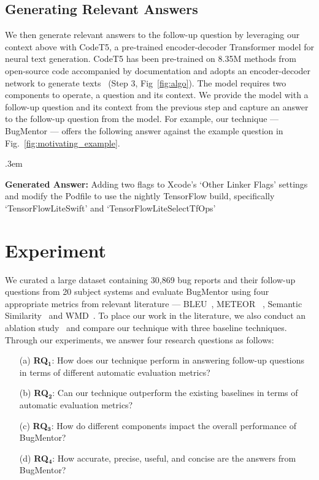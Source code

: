 \subsection{Generating Relevant Answers}
We then generate relevant answers to the follow-up question by leveraging our context above with CodeT5, a pre-trained encoder-decoder Transformer model for neural text generation. CodeT5 has been pre-trained on  8.35M methods from open-source code accompanied by documentation and adopts an encoder-decoder network to generate texts~\cite{wang2021codet5} (Step 3, Fig~\ref{fig:algo}). The model requires two components to operate, a question and its context. We provide the model with a follow-up question and its context from the previous step and capture an answer to the follow-up question from the model. For example, our technique --- BugMentor --- offers the following answer against the example question in Fig.~\ref{fig:motivating_example}.\par

\FrameSep.3em
\begin{frshaded}
\noindent	
\textbf{Generated Answer: }Adding two flags to Xcode's `Other Linker Flags' settings and modify the Podfile to use the nightly TensorFlow build, specifically `TensorFlowLiteSwift' and `TensorFlowLiteSelectTfOps'
\end{frshaded}



\section{Experiment} \label{Chap1:Experiment}
We curated a large dataset containing 30,869 bug reports and their follow-up questions from 20 subject systems and evaluate BugMentor using four appropriate metrics from relevant literature --- BLEU~\cite{papineni2002bleu}, METEOR ~\cite{banerjee2005meteor}, Semantic Similarity~\cite{haque2022semantic} and WMD~\cite{huang2016supervised}. To place our work in the literature, we also conduct an ablation study~\cite{mccandless2010lucene,wang2021codet5} and compare our technique with three baseline techniques. %
Through our experiments, we answer four research questions as follows:
\begin{enumerate}
\item[(a)] \textbf{RQ$\mathbf{_1}$}: How does our technique perform in answering follow-up questions in terms of different automatic evaluation metrics?
\item[(b)] \textbf{RQ$\mathbf{_2}$}: Can our technique outperform the existing baselines in terms of automatic evaluation metrics?
\item[(c)]\textbf{RQ$\mathbf{_3}$}: How do different components impact the overall performance of BugMentor?
\item[(d)]\textbf{RQ$\mathbf{_4}$}: How accurate, precise, useful, and concise are the answers from BugMentor?
\end{enumerate}

